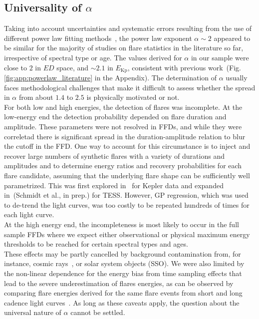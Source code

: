\documentclass{aa}
\begin{document}
\subsection{Universality of $\alpha$}
Taking into account uncertainties and systematic errors resulting from the use of different power law fitting methods~\citep{maschberger2009}, the power law exponent $\alpha\sim 2$ appeared to be similar for the majority of studies on flare statistics in the literature so far, irrespective of spectral type or age. The values derived for $\alpha$ in our sample were close to $2$ in $ED$ space, and $\sim 2.1$ in $E_\mathrm{Kp}$, consistent with previous work~(Fig. \ref{fig:app:powerlaw_literature} in the Appendix). The determination of $\alpha$ usually faces methodological challenges that make it difficult to assess whether the spread in $\alpha$ from about $1.4$ to $2.5$ is physically motivated or not. 
\\
For both low and high energies, the detection of flares was incomplete. At the low-energy end the detection probability depended on flare duration and amplitude. These parameters were not resolved in FFDs, and while they were correletad there is significant spread in the duration-amplitude relation to blur the cutoff in the FFD. One way to account for this circumstance is to inject and recover large numbers of synthetic flares with a variety of durations and amplitudes and to determine energy ratios and recovery probabilities for each flare candidate, assuming that the underlying flare shape can be sufficiently well parametrized. This was first explored in~\citet{davenport_kepler_2014} for Kepler data and expanded in~(Schmidt et al., in prep.) for TESS. However, GP regression, which was used to de-trend the light curves, was too costly to be repeated hundreds of times for each light curve. 
\\
At the high energy end, the incompleteness is most likely to occur in the full sample FFDs where we expect either observational or physical maximum energy thresholds to be reached for certain spectral types and ages. 
\\
These effects may be partly cancelled by background contamination from, for instance, cosmic rays~\citep{aschwanden_powerlaws_2015}, or solar system objects (SSO). We were also limited by the non-linear dependence for the energy bias from time sampling effects that lead to the severe underestimation of flares energies, as can be observed by comparing flare energies derived for the same flare events from short and long cadence light curves~\citep{yang_flaresampling_2018}. As long as these caveats apply, the question about the universal nature of $\alpha$ cannot be settled.
\end{document}
